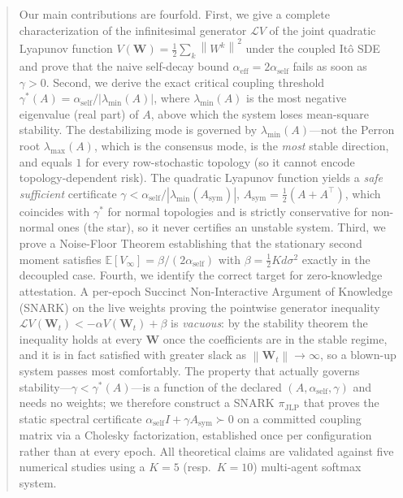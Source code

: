 \documentclass[12pt]{article}
\theoremstyle{plain}
\theoremstyle{definition}
\newcommand{\E}{\mathbb{E}}
\newcommand{\Lgen}{\mathcal{L}}
\newcommand{\W}{\mathbf{W}}
\newcommand{\norm}[1]{\left\lVert #1 \right\rVert}
\newcommand{\abs}[1]{\left| #1 \right|}
\begin{document}
\begin{abstract}
  Our main contributions are fourfold.  First, we give a complete
  characterization of the infinitesimal generator $\Lgen V$ of the joint
  quadratic Lyapunov function $V(\W) = \tfrac{1}{2}\sum_k \norm{W^k}^2$
  under the coupled It\^{o} SDE and prove that the naive self-decay bound
  $\alpha_{\mathrm{eff}} = 2\alpha_{\mathrm{self}}$ fails as soon as
  $\gamma > 0$.  Second, we derive the exact critical coupling threshold
  $\gamma^*(A) = \alpha_{\mathrm{self}} / \abs{\lambda_{\min}(A)}$, where
  $\lambda_{\min}(A)$ is the most negative eigenvalue (real part) of $A$,
  above which the system loses mean-square stability.  The
  destabilizing mode is governed by $\lambda_{\min}(A)$---not the Perron
  root $\lambda_{\max}(A)$, which is the consensus mode, is the \emph{most}
  stable direction, and equals $1$ for every row-stochastic topology (so it
  cannot encode topology-dependent risk).  The quadratic Lyapunov function
  yields a \emph{safe sufficient} certificate $\gamma <
  \alpha_{\mathrm{self}}/\abs{\lambda_{\min}(A_{\mathrm{sym}})}$,
  $A_{\mathrm{sym}}=\tfrac12(A+A^\top)$, which coincides with $\gamma^*$ for
  normal topologies and is strictly conservative for non-normal ones (the
  star), so it never certifies an unstable system.  Third, we prove a
  Noise-Floor Theorem establishing that the stationary second moment
  satisfies $\E[V_\infty] = \beta/(2\alpha_{\mathrm{self}})$ with
  $\beta = \tfrac{1}{2}Kd\sigma^2$ exactly in the decoupled case.
  Fourth, we identify the correct target for zero-knowledge attestation.
  A per-epoch Succinct Non-Interactive Argument of Knowledge (SNARK) on the live weights proving the pointwise generator
  inequality $\Lgen V(\W_t)<-\alpha V(\W_t)+\beta$ is \emph{vacuous}: by the
  stability theorem the inequality holds at every $\W$ once the coefficients
  are in the stable regime, and it is in fact satisfied with greater slack
  as $\norm{\W_t}\to\infty$, so a blown-up system passes most comfortably.
  The property that actually governs stability---$\gamma<\gamma^*(A)$---is a
  function of the declared $(A,\alpha_{\mathrm{self}},\gamma)$ and needs no
  weights; we therefore construct a SNARK $\pi_{\mathrm{JLP}}$ that proves
  the static spectral certificate
  $\alpha_{\mathrm{self}}I+\gamma A_{\mathrm{sym}}\succ0$ on a committed
  coupling matrix via a Cholesky factorization, established once per
  configuration rather than at every epoch.  All
  theoretical claims are validated against five numerical studies using a $K=5$ (resp.\ $K=10$) multi-agent softmax system.
\end{abstract}
\end{document}
